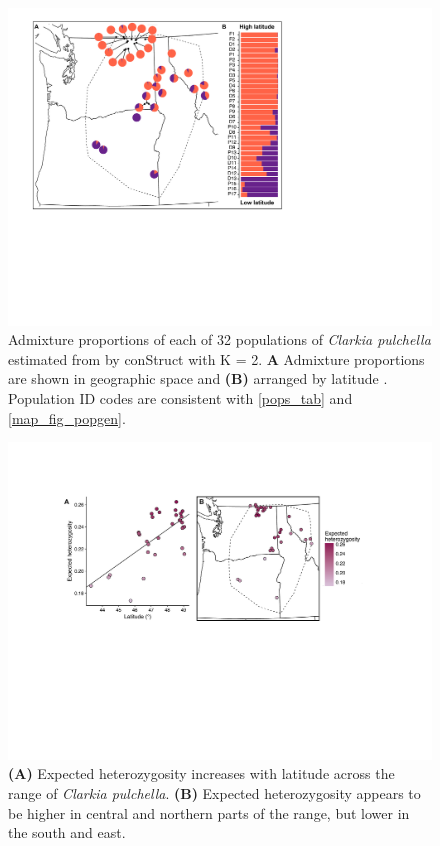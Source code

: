 \documentclass{article}
\begin{document}
\begin{figure}[ht]
\centering
\includegraphics[width=15cm]{figs/construct_main_fig.pdf}
\caption[Admixture proportions of each of 32 populations of \textit{Clarkia pulchella}]{Admixture proportions of each of 32 populations of \textit{Clarkia pulchella} estimated from by conStruct with K = 2. \textbf{A} Admixture proportions are shown in geographic space and \textbf{(B)} arranged by latitude . Population ID codes are consistent with \autoref{pops_tab} and \autoref{map_fig_popgen}.}
\label{construct_main}
\end{figure}

\begin{figure}[ht]
\centering
\includegraphics[width=16cm]{figs/het_map.pdf}
\caption[Expected heterozygosity across the range of \textit{Clarkia pulchella}]{\textbf{(A)} Expected heterozygosity increases with latitude across the range of \textit{Clarkia pulchella}. \textbf{(B)} Expected heterozygosity appears to be higher in central and northern parts of the range, but lower in the south and east.}
\label{het_map}
\end{figure}
\end{document}
